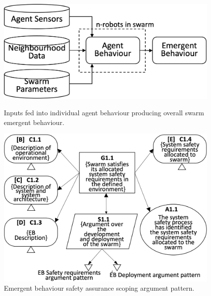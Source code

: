 \documentclass[runningheads]{llncs}
\begin{document}
\begin{figure}[!t]
	\centering
	\begin{minipage}[b]{.45\textwidth}
		\centering
		\includegraphics[width=0.99\textwidth]{figures/stage1-systema-v2.png}
		\caption{Inputs fed into individual agent behaviour producing overall swarm emergent behaviour. }%
		\label{system-description}
	\end{minipage}%
	\hspace*{0.03\textwidth}
	\begin{minipage}[b]{.5\textwidth}
		\centering
		\includegraphics[width=0.99\textwidth]{figures/stage1-argumentpattern-v3.png}
		\vspace{-5ex}
		\caption{Emergent behaviour safety assurance scoping argument pattern.}
		\label{stage1-ap}
	\end{minipage}	
	\vspace{-4ex}
\end{figure}
\end{document}
